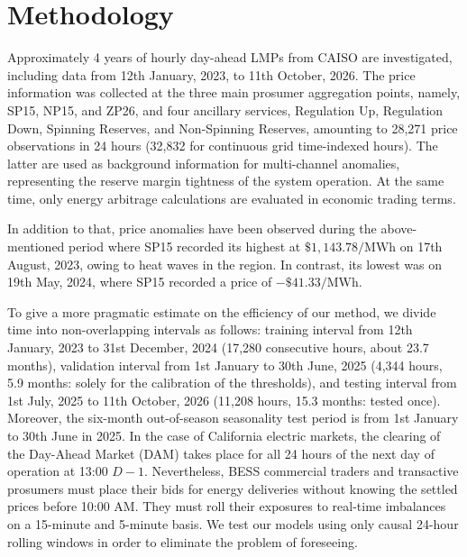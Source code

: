 \documentclass[journal]{IEEEtran}
\begin{document}
\section{Methodology}
\label{sec:methodology}

Approximately 4 years of hourly day-ahead LMPs from CAISO are investigated, including data from 12th January, 2023, to 11th October, 2026. The price information was collected at the three main prosumer aggregation points, namely, SP15, NP15, and ZP26, and four ancillary services, Regulation Up, Regulation Down, Spinning Reserves, and Non-Spinning Reserves, amounting to 28,271 price observations in 24 hours (32,832 for continuous grid time-indexed hours). The latter are used as background information for multi-channel anomalies, representing the reserve margin tightness of the system operation. At the same time, only energy arbitrage calculations are evaluated in economic trading terms.

In addition to that, price anomalies have been observed during the above-mentioned period where SP15 recorded its highest at $\$1,143.78/ \text{MWh}$ on 17th August, 2023, owing to heat waves in the region. In contrast, its lowest was on 19th May, 2024, where SP15 recorded a price of $-\$41.33/ \text{MWh}.$

To give a more pragmatic estimate on the efficiency of our method, we divide time into non-overlapping intervals as follows: training interval from 12th January, 2023 to 31st December, 2024 (17,280 consecutive hours, about 23.7 months), validation interval from 1st January to 30th June, 2025 (4,344 hours, 5.9 months: solely for the calibration of the thresholds), and testing interval from 1st July, 2025 to 11th October, 2026 (11,208 hours, 15.3 months: tested once). Moreover, the six-month out-of-season seasonality test period is from 1st January to 30th June in 2025. In the case of California electric markets, the clearing of the Day-Ahead Market (DAM) takes place for all 24 hours of the next day of operation at 13:00 $D-1$. Nevertheless, BESS commercial traders and transactive prosumers must place their bids for energy deliveries without knowing the settled prices before 10:00 AM. They must roll their exposures to real-time imbalances on a 15-minute and 5-minute basis. We test our models using only causal 24-hour rolling windows in order to eliminate the problem of foreseeing.
\end{document}
